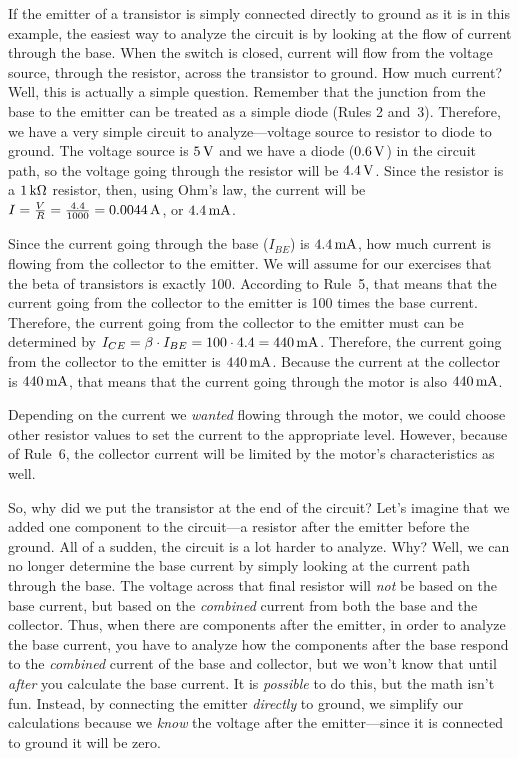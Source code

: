 If the emitter of a transistor is simply connected directly to ground as it is in this example, the easiest way to analyze the circuit is by looking at the flow of current through the base.
When the switch is closed, current will flow from the voltage source, through the resistor, across the transistor to ground.
How much current?
Well, this is actually a simple question.
Remember that the junction from the base to the emitter can be treated as a simple diode (Rules 2 and~3).
Therefore, we have a very simple circuit to analyze---voltage source to resistor to diode to ground.
The voltage source is $5\,\si{\volt}$ and we have a diode ($0.6\,\si{\volt}$) in the circuit path, so the voltage going through the resistor will be $4.4\,\si{\volt}$.
Since the resistor is a $1\,\si{\kilo\ohm}$ resistor, then, using Ohm's law, the current will be $I = \frac{V}{R} = \frac{4.4}{1000} = 0.0044\,\si{\ampere}$, or $4.4\,\si{\milli\ampere}$.

Since the current going through the base ($I_{BE}$) is $4.4\,\si{\milli\ampere}$, how much current is flowing from the collector to the emitter.
We will assume for our exercises that the beta of transistors is exactly 100.
According to Rule~5, that means that the current going from the collector to the emitter is 100 times the base current.
Therefore, the current going from the collector to the emitter must can be determined by $I_{CE} = \beta \cdot I_{BE} = 100\cdot 4.4 = 440\,\si{\milli\ampere}$.
Therefore, the current going from the collector to the emitter is $440\,\si{\milli\ampere}$.  
Because the current at the collector is $440\,\si{\milli\ampere}$, that means that the current going through the motor is also $440\,\si{\milli\ampere}$.

Depending on the current we \emph{wanted} flowing through the motor, we could choose other resistor values to set the current to the appropriate level.
However, because of Rule~6, the collector current will be limited by the motor's characteristics as well.

So, why did we put the transistor at the end of the circuit?
Let's imagine that we added one component to the circuit---a resistor after the emitter before the ground.
All of a sudden, the circuit is a lot harder to analyze.
Why?
Well, we can no longer determine the base current by simply looking at the current path through the base.
The voltage across that final resistor will \emph{not} be based on the base current, but based on the \emph{combined} current from both the base and the collector.
Thus, when there are components after the emitter, in order to analyze the base current, you have to analyze how the components after the base respond to the \emph{combined} current of the base and collector, but we won't know that until \emph{after} you calculate the base current.
It is \emph{possible} to do this, but the math isn't fun.
Instead, by connecting the emitter \emph{directly} to ground, we simplify our calculations because we \emph{know} the voltage after the emitter---since it is connected to ground it will be zero.

